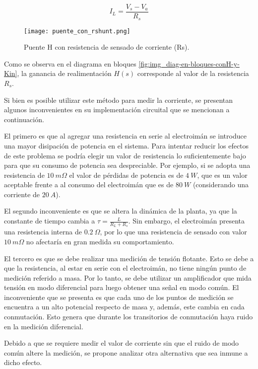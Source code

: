\begin{equation}
	I_L=\frac{V_s-V_a}{R_s}
\end{equation}

\begin{figure}[H]
	\centering
	\texttt{[image: puente\_con\_rshunt.png]}
	\caption{Puente H con resistencia de sensado de corriente (Rs).}
	\label{fig:img_puente_con_rshunt}
\end{figure}

Como se observa en el diagrama en bloques \ref{fig:img_diag-en-bloques-conH-y-Kin}, la ganancia de realimentación $H(s)$ corresponde al valor de la resistencia $R_s$.

Si bien es posible utilizar este método para medir la corriente, se presentan algunos inconvenientes en su implementación circuital que se mencionan a continuación.

El primero es que al agregar una resistencia en serie al electroimán se introduce una mayor disipación de potencia en el sistema. Para intentar reducir los efectos de este problema se podría elegir un valor de resistencia lo suficientemente bajo para que su consumo de potencia sea despreciable. Por ejemplo, si se adopta una resistencia de $10\:m\Omega$ el valor de pérdidas de potencia es de $4\:W$, que es un valor aceptable frente a al consumo del electroimán que es de $80\:W$ (considerando una corriente de $20\:A$).

El segundo inconveniente es que se altera la dinámica de la planta, ya que la constante de tiempo cambia a $\tau=\frac{L}{R_L+R_s}$. Sin embargo, el electroimán presenta una resistencia interna de $0.2\:\Omega$, por lo que una resistencia de sensado con valor $10\:m\Omega$ no afectaría en gran medida su comportamiento.

El tercero es que se debe realizar una medición de tensión flotante. Esto se debe a que la resistencia, al estar en serie con el electroimán, no tiene ningún punto de medición referido a masa. Por lo tanto, se debe utilizar un amplificador que mida tensión en modo diferencial para luego obtener una señal en modo común. El inconveniente que se presenta es que cada uno de los puntos de medición se encuentra a un alto potencial respecto de masa y, además, este cambia en cada conmutación. Esto genera que durante los transitorios de conmutación haya ruido en la medición diferencial.

Debido a que se requiere medir el valor de corriente sin que el ruido de modo común altere la medición, se propone analizar otra alternativa que sea inmune a dicho efecto.


